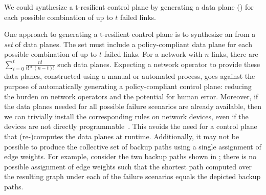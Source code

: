 
We could synthesize a t-resilient control plane by generating a data plane
() for each possible combination of up to $t$ failed
links. 

One approach to generating a t-resilient control plane is to synthesize an
\ARC from a {\em set} of data planes. The set must include a policy-compliant
data plane for each possible combination of up to $t$ failed links. For a
network with $n$ links, there are $\sum_{i=0}^{t} \frac{n!}{t! * (n-t)!}$ such
data planes. Expecting a network operator to provide these data planes,
constructed using a manual or automated process, goes against the purpose of
automatically generating a policy-compliant control plane: reducing the burden
on network operators and the potential for human error. Moreover, if the data
planes needed for all possible failure scenarios are already available, then
we can trivially install the corresponding rules on network devices, even if
the devices are not directly programmable~\cite{TODO}. This avoids the need
for a control plane that (re-)computes the data planes at runtime.
Additionally, it may not be possible to produce the collective set of backup
paths using a single assignment of edge weights. For example, consider the two
backup paths shown in ; there is no possible assignment of
edge weights such that the shortest path computed over the resulting graph
under each of the failure scenarios equals the depicted backup paths.


